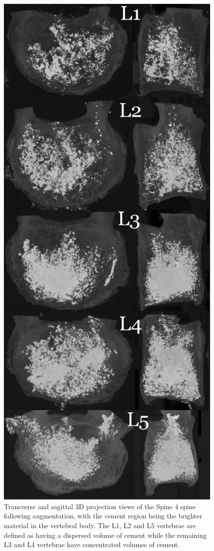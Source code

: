 \begin{figure}[ph!]
  \centering
  \includegraphics[width=.65\textwidth]{Chapters/Chapter_HT_images/G41-11_projections}
	\caption{Transverse and sagittal 3D projection views of the Spine 4 spine following augmentation, with the cement region being the brighter material in the vertebral body. The L1, L2 and L5 vertebrae are defined as having a dispersed volume of cement while the remaining L3 and L4 vertebrae have concentrated volumes of cement.}
  \label{fig:Spine 4_projection}
\end{figure}



